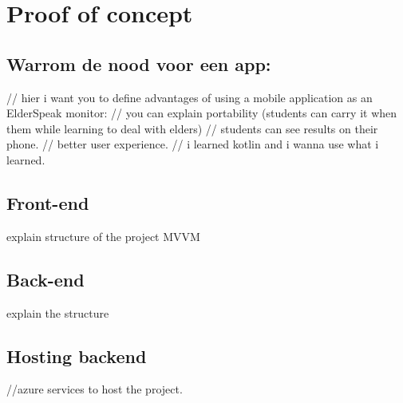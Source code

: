 
\chapter{Proof of concept}%
\label{ch:poc}

\section{Warrom de nood voor een app:}
// hier i want you to define advantages of using a mobile application as an ElderSpeak monitor:
    // you can explain portability (students can carry it when them while learning to deal with elders)
    // students can see results on their phone.
    // better user experience.
// i learned kotlin and i wanna use what i learned.

\section{Front-end}
explain structure of the project MVVM

\section{Back-end}
explain the structure

\section{Hosting backend}
//azure services to host the project.


